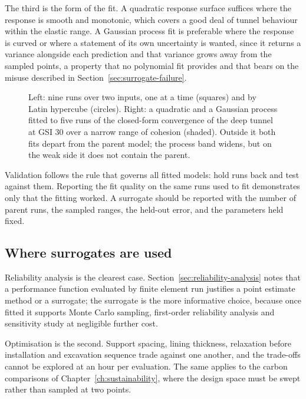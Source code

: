 The third is the form of the fit. A quadratic response surface suffices where
the response is smooth and monotonic, which covers a good deal of tunnel
behaviour within the elastic range. A Gaussian process fit is preferable where
the response is curved or where a statement of its own uncertainty is wanted,
since it returns a variance alongside each prediction and that variance grows
away from the sampled points, a property that no polynomial fit provides and that
bears on the misuse described in Section~\ref{sec:surrogate-failure}.

\begin{figure}[htbp]
\centering
{}
\caption{Left: nine runs over two inputs, one at a time (squares) and by Latin hypercube (circles). Right: a quadratic and a Gaussian process fitted to five runs of the closed-form convergence of the deep tunnel at GSI 30 over a narrow range of cohesion (shaded). Outside it both fits depart from the parent model; the process band widens, but on the weak side it does not contain the parent.}
\label{fig:surrogate}
\end{figure}

Validation follows the rule that governs all fitted models: hold runs back and
test against them. Reporting the fit quality on the same runs used to fit
demonstrates only that the fitting worked. A surrogate should be reported with
the number of parent runs, the sampled ranges, the held-out error, and the
parameters held fixed.

\subsection{Where surrogates are used}
\label{sec:surrogate-use}

Reliability analysis is the clearest case. Section~\ref{sec:reliability-analysis}
notes that a performance function evaluated by finite element run justifies a
point estimate method or a surrogate; the surrogate is the more informative
choice, because once fitted it supports Monte Carlo sampling, first-order
reliability analysis and sensitivity study at negligible further cost.

Optimisation is the second. Support spacing, lining thickness, relaxation
before installation and excavation sequence trade against one another, and the
trade-offs cannot be explored at an hour per evaluation. The same applies to
the carbon comparisons of Chapter~\ref{ch:sustainability}, where the design
space must be swept rather than sampled at two points.

